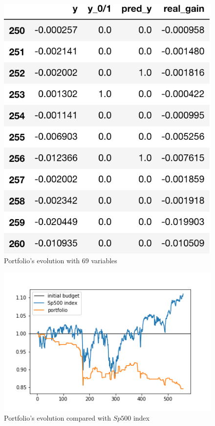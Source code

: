 \documentclass{article}%
\begin{document}
  \begin{figure}[h!]
  \centering
  \includegraphics[scale=0.6]{act_port_log.png}
  \caption{Portfolio's evolution with 69 variables}
  \label{portfolio_table_logit}
  \end{figure}
  
      \begin{figure}[h!]
  \centering
  \includegraphics[scale=0.6]{act_portfolio_logit.png}
  \caption{Portfolio's evolution compared with $Sp500$ index}
  \label{portfolio_graph_logit}
  \end{figure}
\end{document}
